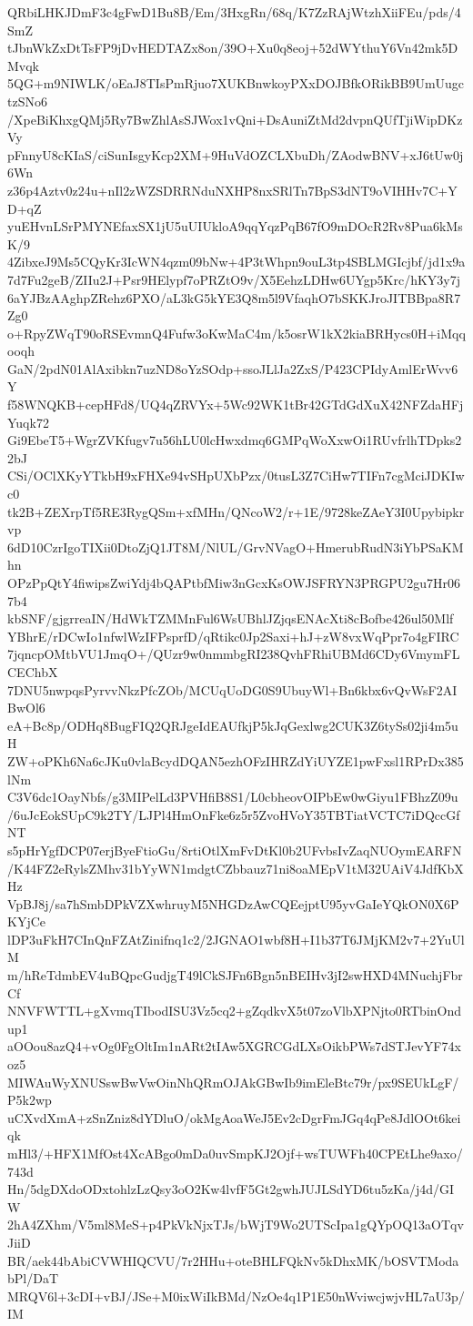 QRbiLHKJDmF3c4gFwD1Bu8B/Em/3HxgRn/68q/K7ZzRAjWtzhXiiFEu/pds/4SmZ
tJbnWkZxDtTsFP9jDvHEDTAZx8on/39O+Xu0q8eoj+52dWYthuY6Vn42mk5DMvqk
5QG+m9NIWLK/oEaJ8TIsPmRjuo7XUKBnwkoyPXxDOJBfkORikBB9UmUugctzSNo6
/XpeBiKhxgQMj5Ry7BwZhlAsSJWox1vQni+DsAuniZtMd2dvpnQUfTjiWipDKzVy
pFnnyU8cKIaS/ciSunIsgyKcp2XM+9HuVdOZCLXbuDh/ZAodwBNV+xJ6tUw0j6Wn
z36p4Aztv0z24u+nIl2zWZSDRRNduNXHP8nxSRlTn7BpS3dNT9oVIHHv7C+YD+qZ
yuEHvnLSrPMYNEfaxSX1jU5uUIUkloA9qqYqzPqB67fO9mDOcR2Rv8Pua6kMsK/9
4ZibxeJ9Ms5CQyKr3IcWN4qzm09bNw+4P3tWhpn9ouL3tp4SBLMGIcjbf/jd1x9a
7d7Fu2geB/ZIIu2J+Psr9HElypf7oPRZtO9v/X5EehzLDHw6UYgp5Krc/hKY3y7j
6aYJBzAAghpZRehz6PXO/aL3kG5kYE3Q8m5l9VfaqhO7bSKKJroJITBBpa8R7Zg0
o+RpyZWqT90oRSEvmnQ4Fufw3oKwMaC4m/k5osrW1kX2kiaBRHycs0H+iMqqooqh
GaN/2pdN01AlAxibkn7uzND8oYzSOdp+ssoJLlJa2ZxS/P423CPIdyAmlErWvv6Y
f58WNQKB+cepHFd8/UQ4qZRVYx+5Wc92WK1tBr42GTdGdXuX42NFZdaHFjYuqk72
Gi9EbeT5+WgrZVKfugv7u56hLU0lcHwxdmq6GMPqWoXxwOi1RUvfrlhTDpks22bJ
CSi/OClXKyYTkbH9xFHXe94vSHpUXbPzx/0tusL3Z7CiHw7TIFn7cgMciJDKIwc0
tk2B+ZEXrpTf5RE3RygQSm+xfMHn/QNcoW2/r+1E/9728keZAeY3I0Upybipkrvp
6dD10CzrIgoTIXii0DtoZjQ1JT8M/NlUL/GrvNVagO+HmerubRudN3iYbPSaKMhn
OPzPpQtY4fiwipsZwiYdj4bQAPtbfMiw3nGcxKsOWJSFRYN3PRGPU2gu7Hr067b4
kbSNF/gjgrreaIN/HdWkTZMMnFul6WsUBhlJZjqsENAcXti8cBofbe426ul50Mlf
YBhrE/rDCwIo1nfwlWzIFPsprfD/qRtikc0Jp2Saxi+hJ+zW8vxWqPpr7o4gFIRC
7jqncpOMtbVU1JmqO+/QUzr9w0nmmbgRI238QvhFRhiUBMd6CDy6VmymFLCEChbX
7DNU5nwpqsPyrvvNkzPfcZOb/MCUqUoDG0S9UbuyWl+Bn6kbx6vQvWsF2AIBwOl6
eA+Bc8p/ODHq8BugFIQ2QRJgeIdEAUfkjP5kJqGexlwg2CUK3Z6tySs02ji4m5uH
ZW+oPKh6Na6cJKu0vlaBcydDQAN5ezhOFzIHRZdYiUYZE1pwFxsl1RPrDx385lNm
C3V6dc1OayNbfs/g3MIPelLd3PVHfiB8S1/L0cbheovOIPbEw0wGiyu1FBhzZ09u
/6uJcEokSUpC9k2TY/LJPl4HmOnFke6z5r5ZvoHVoY35TBTiatVCTC7iDQccGfNT
s5pHrYgfDCP07erjByeFtioGu/8rtiOtlXmFvDtKl0b2UFvbsIvZaqNUOymEARFN
/K44FZ2eRylsZMhv31bYyWN1mdgtCZbbauz71ni8oaMEpV1tM32UAiV4JdfKbXHz
VpBJ8j/sa7hSmbDPkVZXwhruyM5NHGDzAwCQEejptU95yvGaIeYQkON0X6PKYjCe
lDP3uFkH7CInQnFZAtZinifnq1c2/2JGNAO1wbf8H+I1b37T6JMjKM2v7+2YuUlM
m/hReTdmbEV4uBQpcGudjgT49lCkSJFn6Bgn5nBEIHv3jI2swHXD4MNuchjFbrCf
NNVFWTTL+gXvmqTIbodISU3Vz5cq2+gZqdkvX5t07zoVlbXPNjto0RTbinOndup1
aOOou8azQ4+vOg0FgOltIm1nARt2tIAw5XGRCGdLXsOikbPWs7dSTJevYF74xoz5
MIWAuWyXNUSswBwVwOinNhQRmOJAkGBwIb9imEleBtc79r/px9SEUkLgF/P5k2wp
uCXvdXmA+zSnZniz8dYDluO/okMgAoaWeJ5Ev2cDgrFmJGq4qPe8JdlOOt6keiqk
mHl3/+HFX1MfOst4XcABgo0mDa0uvSmpKJ2Ojf+wsTUWFh40CPEtLhe9axo/743d
Hn/5dgDXdoODxtohlzLzQsy3oO2Kw4lvfF5Gt2gwhJUJLSdYD6tu5zKa/j4d/GIW
2hA4ZXhm/V5ml8MeS+p4PkVkNjxTJs/bWjT9Wo2UTScIpa1gQYpOQ13aOTqvJiiD
BR/aek44bAbiCVWHIQCVU/7r2HHu+oteBHLFQkNv5kDhxMK/bOSVTModabPl/DaT
MRQV6l+3cDI+vBJ/JSe+M0ixWiIkBMd/NzOe4q1P1E50nWviwcjwjvHL7aU3p/IM
